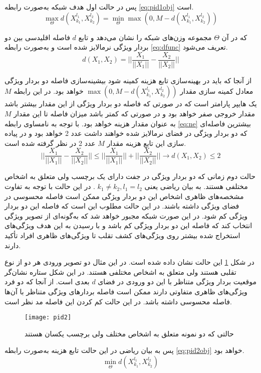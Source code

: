 پس در حالت اول هدف شبکه به‌صورت رابطه
\ref{eq:pid1obj}
است.
\begin{equation}\label{eq:pid1obj}
	\max_{\Theta} {d( X_{k_1}^{l_1},X_{k_2}^{l_2} )} = \min_{\Theta}{\max(0,M-d( X_{k_1}^{l_1},X_{k_2}^{l_2} ))}
\end{equation}

که در آن 
$\Theta$
 مجموعه وزن‌های شبکه را نشان می‌دهد و تابع $d$ فاصله اقلیدسی بین دو بردار ویژگی نرمالایز شده است و به‌صورت رابطه 
\ref{eq:dfunc}
  تعریف می‌شود.
  \begin{equation}\label{eq:dfunc}
  	d(X_1,X_2) = ||\frac{X_1}{||X_1||}-\frac{X_2}{||X_2||}||
  \end{equation}

از آنجا که باید در بهینه‌سازی تابع هزینه کمینه شود بیشینه‌سازی فاصله دو بردار ویژگی معادل کمینه سازی مقدار 
$\max(0,M-d( X_{k_1}^{l_1},X_{k_2}^{l_2} ))$
 خواهد بود. در این رابطه $M$ یک هایپر پارامتر است که در صورتی که فاصله دو بردار ویژگی از این مقدار بیشتر باشد مقدار خروجی صفر خواهد بود و در صورتی که کمتر باشد میزان فاصله تا این مقدار $M$ به عنوان مقدار هزینه خواهد بود.
با توجه به نامساوی رابطه
\ref{eq:ne}
بیشترین فاصله‌ای که دو بردار ویژگی در فضای نرمالایز شده خواهند داشت عدد 2 خواهد بود و در پیاده سازی این تابع هزینه مقدار $M$ عدد 2 در نظر گرفته شده است.
  \begin{equation}\label{eq:ne}
	||\frac{X_1}{||X_1||}-\frac{X_2}{||X_2||}|| \le ||\frac{X_1}{||X_1||}||+||\frac{X_2}{||X_2||}||   \to d(X_1,X_2) \le 2
\end{equation}

حالت دوم زمانی که دو بردار ویژگی در جفت دارای یک برچسب ولی متعلق به اشخاص مختلفی هستند. به بیان ریاضی یعنی  
  $k_1 \ne k_2 , l_1 = l_2 $
. در این حالت با توجه به تفاوت مشخصه‌های ظاهری اشخاص این دو بردار ویژگی ممکن است فاصله محسوسی در فضای ویژگی داشته باشند. در این حالت مطلوب این است که فاصله این دو بردار ویژگی کم شود. در این صورت شبکه مجبور خواهد شد که به‌گونه‌ای از تصویر ویژگی انتخاب کند که فاصله این دو بردار ویژگی کم باشد و با رسیدن به این هدف ویژگی‌های استخراج شده بیشتر روی ویژگی‌های کشف تقلب تا ویژگی‌های ظاهری افراد تأکید دارند.

در شکل
\ref{fig:pid2}
این حالت نشان داده شده است. در این مثال دو تصویر ورودی هر دو از نوع تقلبی هستند ولی متعلق به اشخاص مختلفی هستند. در این شکل ستاره نشان‌گر موقعیت بردار ویژگی متناظر با این دو ورودی در فضای
 $d$ 
بعدی است. از آنجا که دو فرد ویژگی‌های ظاهری متفاوتی دارند ممکن است فاصله بردارهای ویژگی متناظر با آن‌ها فاصله محسوسی داشته باشد. در این حالت کم کردن این فاصله مد نظر است. 
 \begin{figure}[ht]
	\centerline{\texttt{[image: pid2]}}
	\caption{حالتی که دو نمونه متعلق به اشخاص مختلف ولی برچسب یکسان هستند}
	\label{fig:pid2}
\end{figure}
پس به بیان ریاضی در این حالت تابع هزینه به‌صورت رابطه
\ref{eq:pid2obj}
خواهد بود.
\begin{equation}\label{eq:pid2obj}
\min_{\Theta} {d( X_{k_1}^{l_1},X_{k_2}^{l_2} )} 
\end{equation}

